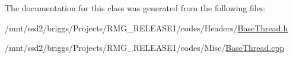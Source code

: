 The documentation for this class was generated from the following files\-:\begin{DoxyCompactItemize}
\item 
/mnt/ssd2/briggs/\-Projects/\-R\-M\-G\-\_\-\-R\-E\-L\-E\-A\-S\-E1/codes/\-Headers/\hyperlink{_base_thread_8h}{Base\-Thread.\-h}\item 
/mnt/ssd2/briggs/\-Projects/\-R\-M\-G\-\_\-\-R\-E\-L\-E\-A\-S\-E1/codes/\-Misc/\hyperlink{_base_thread_8cpp}{Base\-Thread.\-cpp}\end{DoxyCompactItemize}
